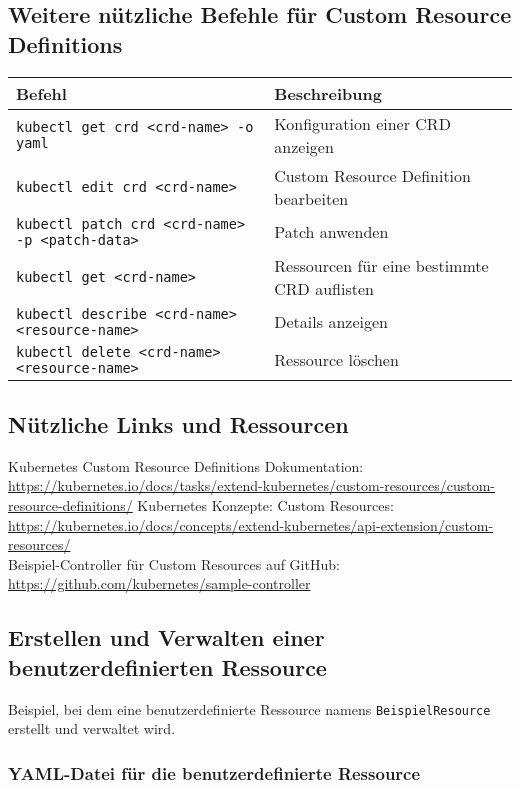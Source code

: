 \subsection{Weitere nützliche Befehle für Custom Resource Definitions}
\begin{tabular}{|p{}|p{}|}
\hline
\textbf{Befehl} & \textbf{Beschreibung} \\
\hline
\texttt{kubectl get crd <crd-name> -o yaml} & Konfiguration einer CRD anzeigen \\
\texttt{kubectl edit crd <crd-name>} & Custom Resource Definition bearbeiten \\
\texttt{kubectl patch crd <crd-name> -p <patch-data>} & Patch anwenden \\
\texttt{kubectl get <crd-name>} & Ressourcen für eine bestimmte CRD auflisten \\
\texttt{kubectl describe <crd-name> <resource-name>} & Details  anzeigen \\
\texttt{kubectl delete <crd-name> <resource-name>} & Ressource löschen \\
\hline
\end{tabular}

\subsection*{Nützliche Links und Ressourcen}
Kubernetes Custom Resource Definitions Dokumentation:\\
{\normalsize\ttfamily\href{https://kubernetes.io/docs/tasks/extend-kubernetes/custom-resources/custom-resource-definitions/}{https://kubernetes.io/docs/tasks/extend-kubernetes/custom-resources/custom-resource-definitions/}}
Kubernetes Konzepte: Custom Resources:\\
\url{https://kubernetes.io/docs/concepts/extend-kubernetes/api-extension/custom-resources/}\\
Beispiel-Controller für Custom Resources auf GitHub:\\
\url{https://github.com/kubernetes/sample-controller}
\subsection{Erstellen und Verwalten einer benutzerdefinierten Ressource}
Beispiel, bei dem eine benutzerdefinierte Ressource namens \texttt{BeispielResource} erstellt und verwaltet wird.

\subsubsection{YAML-Datei für die benutzerdefinierte Ressource}


